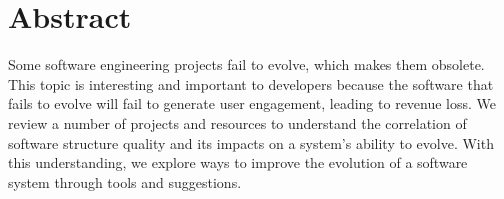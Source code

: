 \section*{Abstract} \label{sectionAbstract}

Some software engineering projects fail to evolve, which makes them obsolete.
This topic is interesting and important to developers because the software that fails to evolve will fail to generate user engagement, leading to revenue loss.
We review a number of projects and resources to understand the correlation of software structure quality and its impacts on a system's ability to evolve.
With this understanding, we explore ways to improve the evolution of a software system through tools and suggestions.


